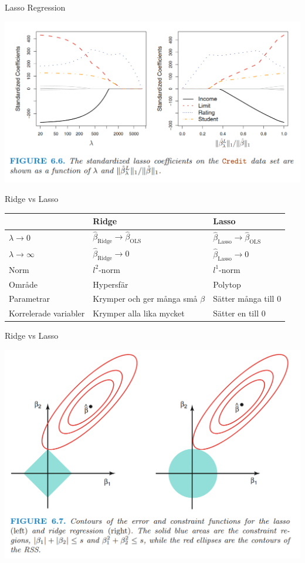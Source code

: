 \documentclass[10pt,english]{beamer}
\begin{document}
\begin{frame}{Lasso Regression}
    
    \includegraphics[width=\textwidth]{figs/standardized lasso coefficients.png}

\end{frame}

\begin{frame}{Ridge vs Lasso}
    \begin{tabular}{lll}
        & Ridge & Lasso \\ \hline
        $\lambda \to 0$ & $\hat{\beta}_{\text{Ridge}} \to \hat{\beta}_{\text{OLS}}$ & $\hat{\beta}_{\text{Lasso}} \to \hat{\beta}_{\text{OLS}}$ \\
        $\lambda \to \infty$ &  $\hat{\beta}_{\text{Ridge}} \to 0$ &  $\hat{\beta}_{\text{Lasso}} \to 0$ \\
        Norm & $l^2$-norm & $l^1$-norm \\
        Område & Hypersfär & Polytop \\
        Parametrar & Krymper och ger många små $\beta$ & Sätter många till 0 \\
        Korrelerade variabler & Krymper alla lika mycket & Sätter en till 0
    \end{tabular}
\end{frame}

\begin{frame}{Ridge vs Lasso}

    \includegraphics[width=\textwidth]{figs/Contours of the error .png}
    
\end{frame}
\end{document}
